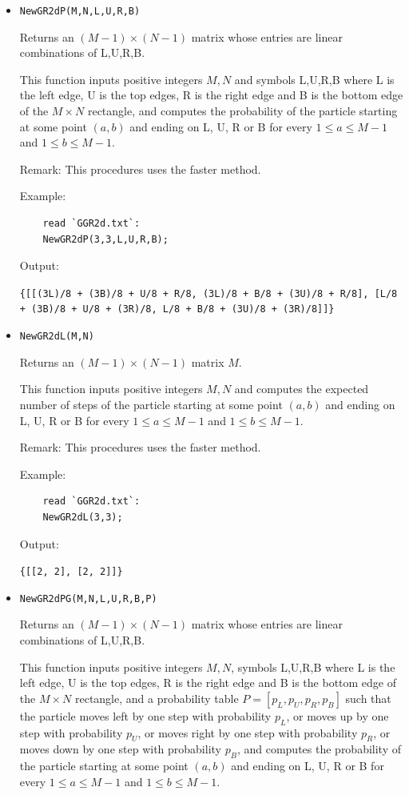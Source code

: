 \documentclass[reqno]{amsart}
\theoremstyle{definition}
\theoremstyle{definition}
\theoremstyle{remark}
\begin{document}
\begin{itemize}
    \lstinline!{[[2, 2], [2, 2]]}!

    \item \lstinline{NewGR2dP(M,N,L,U,R,B)}

    Returns an $(M-1) \times (N-1)$ matrix whose entries are linear combinations of L,U,R,B.
    
    This function inputs positive integers $M, N$ and symbols L,U,R,B where L is the left edge, U is the top edges, R is the right edge and B is the bottom edge of the $M\times N$ rectangle, and computes the probability of the particle starting at some point $(a,b)$ and ending on L, U, R or B for every $1\leq a \leq M-1$ and $1\leq b \leq M-1$.

    Remark: This procedures uses the faster method. 
    
    Example:
    
    \begin{lstlisting}
    read `GGR2d.txt`:
    NewGR2dP(3,3,L,U,R,B);
    \end{lstlisting}
    Output:
    
    \lstinline!{[[(3L)/8 + (3B)/8 + U/8 + R/8, (3L)/8 + B/8 + (3U)/8 + R/8], [L/8 + (3B)/8 + U/8 + (3R)/8, L/8 + B/8 + (3U)/8 + (3R)/8]]}!

    
    \item \lstinline{NewGR2dL(M,N)}
    
    Returns an $(M-1)\times (N-1)$ matrix $M$.
    
    This function inputs positive integers $M, N$ and computes the expected number of steps of the particle starting at some point $(a,b)$ and ending on L, U, R or B for every $1\leq a \leq M-1$ and $1\leq b \leq M-1$.

     Remark: This procedures uses the faster method.
    
    Example:
    
    \begin{lstlisting}
    read `GGR2d.txt`:
    NewGR2dL(3,3);
    \end{lstlisting}
    Output:
    
    \lstinline!{[[2, 2], [2, 2]]}!

      \item \lstinline{NewGR2dPG(M,N,L,U,R,B,P)}

    Returns an $(M-1) \times (N-1)$ matrix whose entries are linear combinations of L,U,R,B.
    
    This function inputs positive integers $M, N$, symbols L,U,R,B where L is the left edge, U is the top edges, R is the right edge and B is the bottom edge of the $M\times N$ rectangle, and a probability table $P=[p_L,p_U,p_R,p_B]$ such that the particle moves left by one step with probability $p_L$, or moves up by one step with probability $p_U$, or moves right by one step with probability $p_R$, or moves down by one step with probability $p_B$, and computes the probability of the particle starting at some point $(a,b)$ and ending on L, U, R or B for every $1\leq a \leq M-1$ and $1\leq b \leq M-1$.


\end{itemize}
\end{document}

